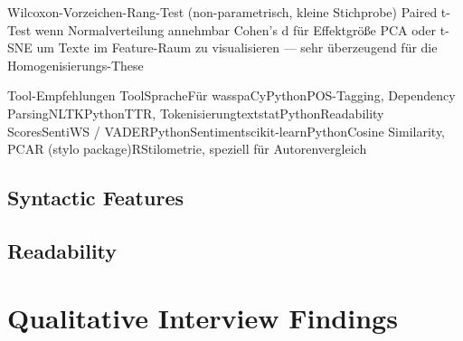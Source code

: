 Wilcoxon-Vorzeichen-Rang-Test (non-parametrisch, kleine Stichprobe)
Paired t-Test wenn Normalverteilung annehmbar
Cohen's d für Effektgröße
PCA oder t-SNE um Texte im Feature-Raum zu visualisieren — sehr überzeugend für die Homogenisierungs-These


Tool-Empfehlungen
ToolSpracheFür wasspaCyPythonPOS-Tagging, Dependency ParsingNLTKPythonTTR, TokenisierungtextstatPythonReadability ScoresSentiWS / VADERPythonSentimentscikit-learnPythonCosine Similarity, PCAR (stylo package)RStilometrie, speziell für Autorenvergleich
\subsection{Syntactic Features}
\subsection{Readability}

\section{Qualitative Interview Findings}